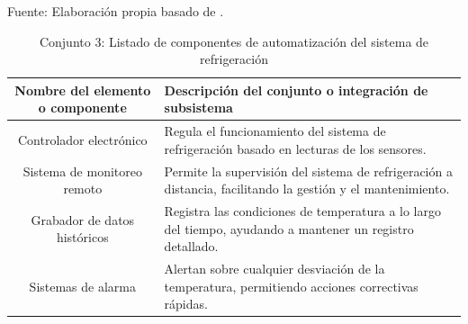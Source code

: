 \begin{table}[H]
	\centering
	\caption{Conjunto 3: Listado de componentes de automatización del sistema de refrigeración}
	Fuente: Elaboración propia basado de .
	\begin{tabular}{@{}cl@{}}
		\toprule
		\begin{minipage}[t]{0.25\linewidth}\textbf{Nombre del elemento o componente}\end{minipage} & \begin{minipage}[t]{0.60\linewidth}\textbf{Descripción del conjunto o integración de subsistema}\end{minipage} \\
		
		\midrule
		Controlador electrónico                   & \begin{minipage}[t]{0.6\linewidth}Regula el funcionamiento del sistema de refrigeración basado en lecturas de los sensores.\end{minipage} \\
		Sistema de monitoreo remoto               & \begin{minipage}[t]{0.6\linewidth}Permite la supervisión del sistema de refrigeración a distancia, facilitando la gestión y el mantenimiento.\end{minipage} \\
		Grabador de datos históricos              & \begin{minipage}[t]{0.6\linewidth}Registra las condiciones de temperatura a lo largo del tiempo, ayudando a mantener un registro detallado.\end{minipage} \\
		Sistemas de alarma                        & \begin{minipage}[t]{0.6\linewidth}Alertan sobre cualquier desviación de la temperatura, permitiendo acciones correctivas rápidas.\end{minipage} \\ \bottomrule
	\end{tabular}
	\label{tabla:automatizacion}
\end{table}




